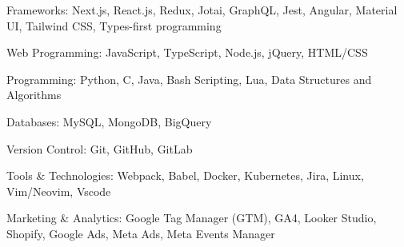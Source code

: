 
\begin{cvskills}

  \cvskill
    {Frameworks:}
    {Next.js, React.js, Redux, Jotai, GraphQL, Jest, Angular, Material UI, Tailwind CSS, Types-first programming}

    
  \cvskill
    {Web Programming:}
    {JavaScript, TypeScript, Node.js, jQuery, HTML/CSS}


  \cvskill
    {Programming:}
    {Python, C, Java, Bash Scripting, Lua, Data Structures and Algorithms}


  \cvskill
    {Databases:}
    {MySQL, MongoDB, BigQuery}


  \cvskill
    {Version Control:}
    {Git, GitHub, GitLab}

 
  \cvskill
    {Tools \& Technologies:}
    {Webpack, Babel, Docker, Kubernetes, Jira, Linux, Vim/Neovim, Vscode}


  \cvskill
    {Marketing \& Analytics:}
    {Google Tag Manager (GTM), GA4, Looker Studio, Shopify, Google Ads, Meta Ads, Meta Events Manager}


\end{cvskills}

